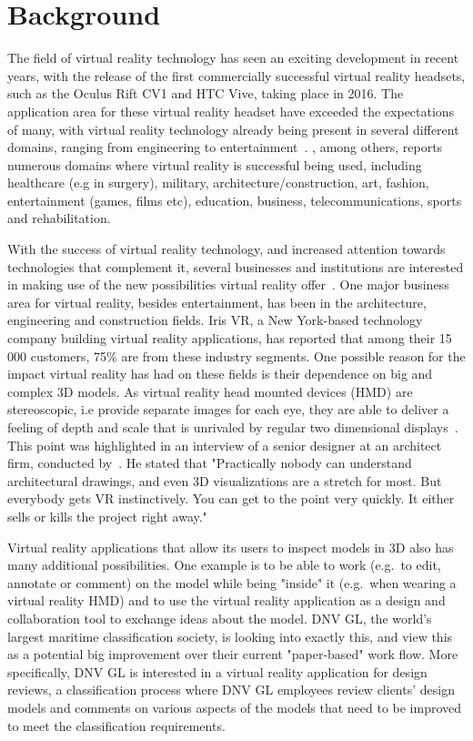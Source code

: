 \section{Background}           
The field of virtual reality technology has seen an exciting development in recent years, 
with the release of the first commercially successful virtual reality headsets, such as the Oculus Rift CV1 and HTC Vive, taking place in 2016.
The application area for these virtual reality headset have exceeded the expectations of many, with virtual reality 
technology already being present in several different domains, ranging from engineering to entertainment~\citep{VRS2016}. 
\citet{VRS2016}, among others, reports numerous domains where virtual reality is successful being used, including 
healthcare (e.g in surgery), military, architecture/construction, art, fashion, entertainment (games, films etc), education, business, telecommunications, sports and rehabilitation.

With the success of virtual reality technology, and increased attention towards technologies that complement it, several businesses and institutions 
are interested in making use of the new possibilities virtual reality offer~\citep{TW22016}. One major business area for virtual reality, besides entertainment, 
has been in the architecture, engineering and construction fields. Iris VR, a New York-based technology company building virtual reality applications, has reported that
among their 15 000 customers, 75\% are from these industry segments. One possible reason for the impact virtual reality has had on these fields is their dependence 
on big and complex 3D models. As virtual reality head mounted devices (HMD) are stereoscopic, i.e provide separate images for each eye, they are able to deliver a feeling of 
depth and scale that is unrivaled by regular two dimensional displays~\citep{POLYGON2016}. This point was highlighted in an interview of a senior designer at an architect 
firm, conducted by~\citet{TW22016}. He stated that "Practically nobody can understand architectural drawings, and even 3D visualizations are a stretch for most. 
But everybody gets VR instinctively. You can get to the point very quickly. It either sells or kills the project right away." 

Virtual reality applications that allow its users to inspect models in 3D also has many additional possibilities. 
One example is to be able to work (e.g.~to edit, annotate or comment) on the model while being "inside" it (e.g.~when wearing a virtual reality HMD) and 
to use the virtual reality application as a design and collaboration tool to exchange ideas about the model.
DNV GL, the world's largest maritime classification society, is looking into exactly this, and view this as a potential big improvement over their current 
"paper-based" work flow. More specifically, DNV GL is interested in a virtual reality application for design reviews, a classification process where DNV GL employees review 
clients' design models and comments on various aspects of the models that need to be improved to meet the classification requirements. 

